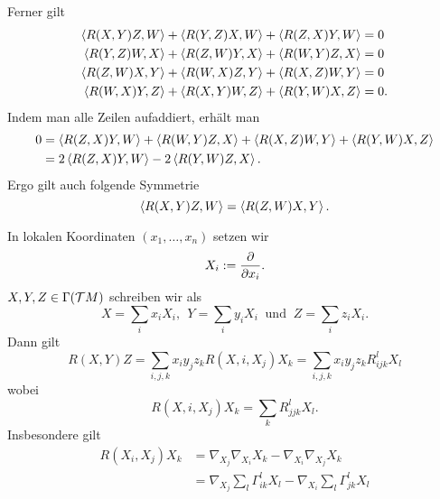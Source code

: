 Ferner gilt
\begin{align*}
\left<R(X,Y)Z, W\right> + \left< R(Y,Z)X ,W\right> + \left< R(Z,X)Y , W\right> &= 0\\
\left<R(Y,Z)W, X\right> + \left< R(Z,W)Y ,X\right> + \left< R(W,Y)Z , X\right> &= 0\\
\left<R(Z,W)X, Y\right> + \left< R(W,X)Z ,Y\right> + \left< R(X,Z)W , Y\right> &= 0\\
\left<R(W,X)Y, Z\right> + \left< R(X,Y)W ,Z\right> + \left< R(Y,W)X , Z\right> &= 0.
\end{align*}
Indem man alle Zeilen aufaddiert, erhält man
\begin{align*}
0 &= \left< R(Z,X)Y , W\right> + \left< R(W,Y)Z , X\right> + \left< R(X,Z)W , Y\right> +\left< R(Y,W)X , Z\right>  \\
&= 2 \left<R(Z,X)Y,W\right> - 2 \left< R(Y,W)Z,X \right>.
\end{align*}
Ergo gilt auch folgende Symmetrie
\[ \left<R(X,Y)Z, W\right> = \left<R(Z,W)X,Y\right>.  \]


In lokalen Koordinaten $(x_1, \ldots, x_n)$ setzen wir
\[ X_i := \frac{\partial }{\partial x_i}. \]
$X,Y,Z \in \Gamma(\mathcal{T} M)$ schreiben wir als
\[ X = \sum_i x_i X_i,~~ Y = \sum_i y_i X_i~ \text{ und }~ Z = \sum_i z_i X_i. \]
Dann gilt
\[ R(X,Y)Z = \sum_{i,j,k} x_i y_j z_k R(X,i,X_j)X_k = \sum_{i,j,k} x_i y_j z_k R^l_{ijk} X_l \]
wobei
\[ R(X,i,X_j)X_k = \sum_k R_{jjk}^l X_l. \]
Insbesondere gilt
\begin{align*}
R(X_i, X_j)X_k &= \nabla_{X_j} \nabla_{X_i} X_k - \nabla_{X_i} \nabla_{X_j} X_k\\
&= \nabla_{X_j} \sum_l \Gamma_{ik}^l X_l - \nabla_{X_i} \sum_l \Gamma_{jk}^l X_l
\end{align*}